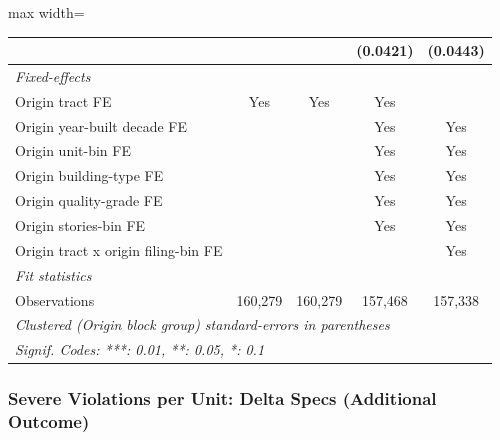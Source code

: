 \documentclass[
  11pt,
]{article}
\begin{document}
\begin{adjustbox}{max width=\textwidth}
\begin{tabular}{lcccc}
                                                  &                &                & (0.0421)       & (0.0443)\\   
   \midrule
   \emph{Fixed-effects}\\
   Origin tract FE                                & Yes            & Yes            & Yes            & \\  
   Origin year-built decade FE                    &                &                & Yes            & Yes\\  
   Origin unit-bin FE                             &                &                & Yes            & Yes\\  
   Origin building-type FE                        &                &                & Yes            & Yes\\  
   Origin quality-grade FE                        &                &                & Yes            & Yes\\  
   Origin stories-bin FE                          &                &                & Yes            & Yes\\  
   Origin tract x origin filing-bin FE            &                &                &                & Yes\\  
   \midrule
   \emph{Fit statistics}\\
   Observations                                   & 160,279        & 160,279        & 157,468        & 157,338\\  
   \midrule \midrule
   \multicolumn{5}{l}{\emph{Clustered (Origin block group) standard-errors in parentheses}}\\
   \multicolumn{5}{l}{\emph{Signif. Codes: ***: 0.01, **: 0.05, *: 0.1}}\\
\end{tabular}
\par\endgroup

\end{adjustbox}

\subsubsection{Severe Violations per Unit: Delta Specs (Additional
Outcome)}\label{severe-violations-per-unit-delta-specs-additional-outcome}
\end{document}
